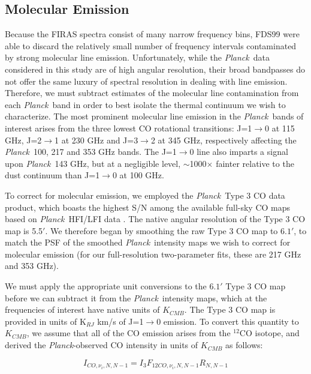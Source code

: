 \documentclass{emulateapj}
\newcommand{\PLANCK}{{\it Planck}}
\begin{document}
\subsection{Molecular Emission}
Because the FIRAS spectra consist of many narrow frequency bins, FDS99 were
able to discard the relatively small number of frequency intervals contaminated
by strong molecular line emission. Unfortunately, while the \PLANCK~data 
considered in this study are of high angular resolution, their broad bandpasses
do not offer the same luxury of spectral resolution in dealing with line 
emission. Therefore, we must subtract estimates of the molecular line 
contamination from each \PLANCK~band in order to best isolate the thermal 
continuum we wish to characterize. The most prominent molecular line emission 
in the \PLANCK~bands of interest arises from the three lowest CO rotational
transitions: J=1$\rightarrow$0 at 115 GHz, J=2$\rightarrow$1 at 230 GHz and 
J=3$\rightarrow$2 at 345 GHz, respectively affecting the \PLANCK~100, 217 and 
353 GHz bands. The J=1$\rightarrow$0 line also imparts a signal upon 
\PLANCK~143 GHz, but at a negligible level, $\sim$1000$\times$ fainter relative
to the dust continuum than J=1$\rightarrow$0 at 100 GHz.

To correct for molecular emission, we employed the \PLANCK~Type 3 CO 
data product, which boasts the highest S/N 
among the available full-sky CO maps based on \PLANCK~HFI/LFI 
data \citep{planckco}. The native angular resolution of the Type 3 CO map is 
5.5$'$. We therefore began by smoothing the raw Type 3 CO map to $6.1'$, to 
match the PSF of the smoothed \PLANCK~intensity maps we wish to correct 
for molecular emission (for our full-resolution two-parameter fits, these are 
217 GHz and 353 GHz). 


We must apply the appropriate unit conversions to the $6.1'$ Type 3 CO
map before we can subtract it from the \PLANCK~intensity maps, which at the
frequencies of interest have native units of $K_{CMB}$. The Type 3 CO map
is provided in units of K$_{RJ}$ km/s of J=1$\rightarrow$0 emission. 
To convert this quantity to $K_{CMB}$, we assume that all of the CO emission 
arises from the $^{12}$CO isotope, and derived the \PLANCK-observed CO 
intensity in units of $K_{CMB}$ as follows:

\begin{equation}
I_{CO, \nu_i, N, N-1} = I_{3}F_{12CO, \nu_i, N, N-1} R_{N, N-1}
\end{equation}
\end{document}
